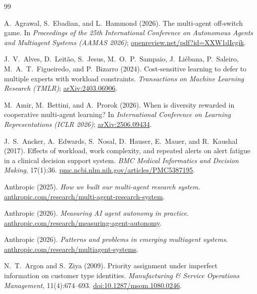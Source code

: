 \documentclass[11pt,reqno]{amsart}
\theoremstyle{spacious}
\begin{document}
\clearpage
\begingroup
\setlength{\parskip}{1.2pt}
\setlength{\bibsep}{0pt}
\raggedright
\sloppy
\begin{thebibliography}{99}

A.~Agrawal, S.~Ebadian, and L.~Hammond (2026). The multi-agent off-switch game. In \emph{Proceedings of the 25th International Conference on Autonomous Agents and Multiagent Systems (AAMAS 2026)}; \href{https://openreview.net/pdf?id=XXW1dIcgik}{openreview.net/pdf?id=XXW1dIcgik}.

J.~V.~Alves, D.~Leit\~ao, S.~Jesus, M.~O.~P.~Sampaio, J.~Li\'ebana, P.~Saleiro, M.~A.~T.~Figueiredo, and P.~Bizarro (2024). Cost-sensitive learning to defer to multiple experts with workload constraints. \emph{Transactions on Machine Learning Research (TMLR)}; \href{https://arxiv.org/abs/2403.06906}{arXiv:2403.06906}.

M.~Amir, M.~Bettini, and A.~Prorok (2026). When is diversity rewarded in cooperative multi-agent learning? In \emph{International Conference on Learning Representations (ICLR 2026)}; \href{https://arxiv.org/abs/2506.09434}{arXiv:2506.09434}.

J.~S.~Ancker, A.~Edwards, S.~Nosal, D.~Hauser, E.~Mauer, and R.~Kaushal (2017). Effects of workload, work complexity, and repeated alerts on alert fatigue in a clinical decision support system. \emph{BMC Medical Informatics and Decision Making}, 17(1):36. \href{https://pmc.ncbi.nlm.nih.gov/articles/PMC5387195/}{pmc.ncbi.nlm.nih.gov/articles/PMC5387195}.

Anthropic (2025). \emph{How we built our multi-agent research system}. \href{https://www.anthropic.com/research/multi-agent-research-system}{anthropic.com/research/multi-agent-research-system}.

Anthropic (2026). \emph{Measuring AI agent autonomy in practice}. \href{https://www.anthropic.com/research/measuring-agent-autonomy}{anthropic.com/research/measuring-agent-autonomy}.

Anthropic (2026). \emph{Patterns and problems in emerging multiagent systems}. \href{https://www.anthropic.com/research/multiagent-systems}{anthropic.com/research/multiagent-systems}.

N.~T.~Argon and S.~Ziya (2009). Priority assignment under imperfect information on customer type identities. \emph{Manufacturing \& Service Operations Management}, 11(4):674--693. \href{https://pubsonline.informs.org/doi/10.1287/msom.1080.0246}{doi:10.1287/msom.1080.0246}.


\end{thebibliography}
\end{document}
